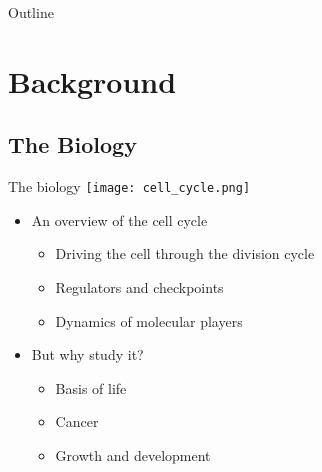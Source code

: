 





\begin{frame}
  \titlepage
\end{frame}

\begin{frame}{Outline}
  \tableofcontents
\end{frame}

\section{Background}

\subsection{The Biology}
\begin{frame}{The biology}
\texttt{[image: cell\_cycle.png]}
  \begin{itemize} 
\item An overview of the cell cycle 
\begin{itemize}
  \item{    Driving the cell through the division cycle  }
  \item{Regulators and checkpoints}
  \item{   Dynamics of molecular players}
  \end{itemize}
\item But why study it?	

\begin{itemize}
  \item{  Basis of life}

  \item{  Cancer}

  \item{  Growth and development}
\end{itemize}
\end{itemize}
\end{frame}
